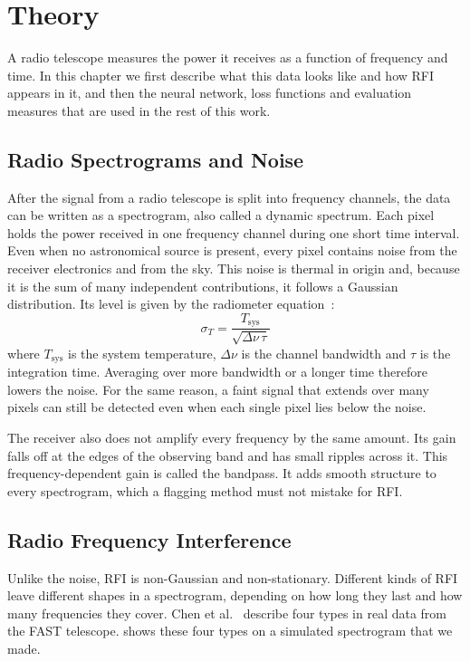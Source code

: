 \chapter{Theory}
\label{ch:theory}
A radio telescope measures the power it receives as a function of frequency
and time. In this chapter we first describe what this data looks like and how
RFI appears in it, and then the neural network, loss functions and evaluation
measures that are used in the rest of this work.

\section{Radio Spectrograms and Noise}
After the signal from a radio telescope is split into frequency channels, the
data can be written as a spectrogram, also called a dynamic spectrum. Each
pixel holds the power received in one frequency channel during one short time
interval. Even when no astronomical source is present, every pixel contains
noise from the receiver electronics and from the sky. This noise is thermal in
origin and, because it is the sum of many independent contributions, it
follows a Gaussian distribution. Its level is given by the radiometer
equation~\cite{wilson2013tools}:
\begin{equation}
  \sigma_T = \frac{T_{\text{sys}}}{\sqrt{\Delta\nu\,\tau}}
  \label{eq:radiometer}
\end{equation}
where $T_{\text{sys}}$ is the system temperature, $\Delta\nu$ is the channel
bandwidth and $\tau$ is the integration time. Averaging over more bandwidth or a
longer time therefore lowers the noise. For the same reason, a faint signal
that extends over many pixels can still be detected even when each single
pixel lies below the noise.

The receiver also does not amplify every frequency by the same amount. Its gain
falls off at the edges of the observing band and has small ripples across it.
This frequency-dependent gain is called the bandpass. It adds smooth structure
to every spectrogram, which a flagging method must not mistake for RFI.

\section{Radio Frequency Interference}
\label{sec:rfi_types}
Unlike the noise, RFI is non-Gaussian and non-stationary. Different kinds of
RFI leave different shapes in a spectrogram, depending on how long they last
and how many frequencies they cover. Chen et al.~\cite{chen2023} describe four
types in real data from the FAST telescope.  shows these four
types on a simulated spectrogram that we made.

